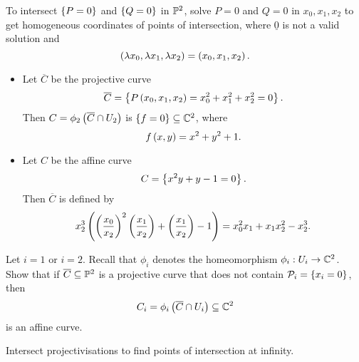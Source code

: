 \begin{remark*}
To intersect $ \cb{P = 0} $ and $ \cb{Q = 0} $ in $ \P^2 $, solve $ P = 0 $ and $ Q = 0 $ in $ x_0, x_1, x_2 $ to get homogeneous coordinates of points of intersection, where $ \underline{0} $ is not a valid solution and
$$ \rb{\lambda x_0, \lambda x_1, \lambda x_2} = \rb{x_0, x_1, x_2}. $$
\end{remark*}

\begin{example}
\hfill
\begin{itemize}
\item Let $ \overline{C} $ be the projective curve
$$ \overline{C} = \cb{P\rb{x_0, x_1, x_2} = x_0^2 + x_1^2 + x_2^2 = 0}. $$
Then $ C = \phi_2\rb{\overline{C} \cap U_2} $ is $ \cb{f = 0} \subseteq \C^2 $, where
$$ f\rb{x, y} = x^2 + y^2 + 1. $$
\item Let $ C $ be the affine curve
$$ C = \cb{x^2y + y - 1 = 0}. $$
Then $ \overline{C} $ is defined by
$$ x_2^3\rb{\rb{\dfrac{x_0}{x_2}}^2\rb{\dfrac{x_1}{x_2}} + \rb{\dfrac{x_1}{x_2}} - 1} = x_0^2x_1 + x_1x_2^2 - x_2^3. $$
\end{itemize}
\end{example}

\begin{exercise}
Let $ i = 1 $ or $ i = 2 $. Recall that $ \phi_i $ denotes the homeomorphism $ \phi_i : U_i \to \C^2 $. Show that if $ \overline{C} \subseteq \P^2 $ is a projective curve that does not contain $ \PP_i = \cb{x_i = 0} $, then
$$ C_i = \phi_i\rb{\overline{C} \cap U_i} \subseteq \C^2 $$
is an affine curve.
\end{exercise}


Intersect projectivisations to find points of intersection at infinity.

